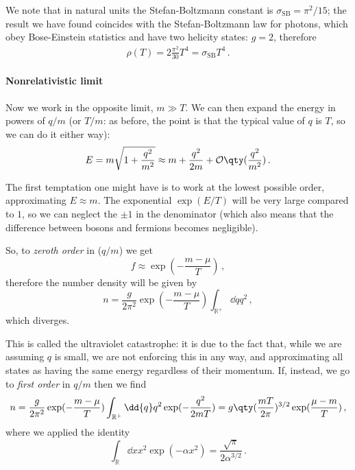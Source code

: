 \documentclass[main.tex]{subfiles}
\begin{document}
We note that in natural units the Stefan-Boltzmann constant is \(\sigma_{\text{SB}} = \pi^2 / 15\); the result we have found coincides with the Stefan-Boltzmann law for photons, which obey Bose-Einstein statistics and have two helicity states: \(g = 2\), therefore 
%
\begin{align}
\rho (T) = 2 \frac{\pi^2}{30 } T^{4} = \sigma_{\text{SB}} T^{4}
\,.
\end{align}

\paragraph{Nonrelativistic limit}

Now we work in the opposite limit, \(m \gg T\).
We can then expand the energy in powers of \(q/m\) (or \(T/m\): as before, the point is that the typical value of \(q\) is \(T\), so we can do it either way): 
%
\begin{align}
E = m \sqrt{1 + \frac{q^2}{m^2}} \approx m + \frac{q^2}{2m} + \mathcal{O}\qty( \frac{q^2}{m^2})
\,.
\end{align}

The first temptation one might have is to work at the lowest possible order, approximating \(E \approx m\). 
The exponential \(\exp(E / T)\) will be very large compared to \(1\), so we can neglect the \(\pm 1\) in the denominator (which also means that the difference between bosons and fermions becomes negligible).

So, to \emph{zeroth order} in (\(q/m\)) we get 
%
\begin{equation}
  f \approx \exp(-\frac{m- \mu }{T}) 
\,,
\end{equation}
%
therefore the number density will be given by
%
\begin{equation}
  n = \frac{g}{2 \pi^2} \exp(-\frac{m- \mu }{T}) \int _{\mathbb{R}^{+}} \dd{q}q^2 
\,,
\end{equation}
%
which diverges.

This is called the ultraviolet catastrophe: it is due to the fact that, while we are assuming \(q\) is small, we are not enforcing this in any way, and approximating all states as having the same energy regardless of their momentum. If, instead, we go to \emph{first order} in \(q/m\) then we find 
%
\begin{equation} \label{eq:boltzmann-statistics-number-density}
    n = \frac{g}{2 \pi^2} \exp(-\frac{m- \mu }{T}) \int _{\mathbb{R}^{+}} \dd{q}q^2 \exp(-\frac{q^2}{2mT}) 
    = g \qty(\frac{mT}{2 \pi })^{3/2} \exp(\frac{\mu - m}{T}) 
  \,,
\end{equation}
where we applied the identity 
%
\begin{equation}
  \int _{\mathbb{R}} \dd{x} x^2 \exp(-\alpha x^2) = \frac{\sqrt{\pi } }{2 \alpha^{3/2}} 
\,.
\end{equation}
%
\end{document}
